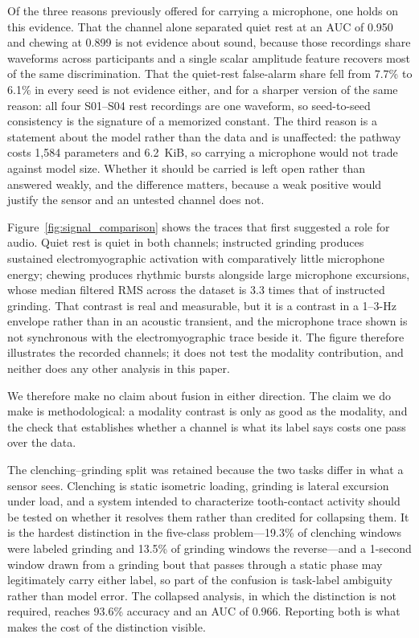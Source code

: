 \documentclass[pdflatex,sn-nature,iicol]{sn-jnl}
\begin{document}
Of the three reasons previously offered for carrying a microphone, one holds on this evidence. That the channel alone separated quiet rest at an AUC of 0.950 and chewing at 0.899 is not evidence about sound, because those recordings share waveforms across participants and a single scalar amplitude feature recovers most of the same discrimination. That the quiet-rest false-alarm share fell from 7.7\% to 6.1\% in every seed is not evidence either, and for a sharper version of the same reason: all four S01--S04 rest recordings are one waveform, so seed-to-seed consistency is the signature of a memorized constant. The third reason is a statement about the model rather than the data and is unaffected: the pathway costs 1,584 parameters and 6.2~KiB, so carrying a microphone would not trade against model size. Whether it should be carried is left open rather than answered weakly, and the difference matters, because a weak positive would justify the sensor and an untested channel does not.

Figure~\ref{fig:signal_comparison} shows the traces that first suggested a role for audio. Quiet rest is quiet in both channels; instructed grinding produces sustained electromyographic activation with comparatively little microphone energy; chewing produces rhythmic bursts alongside large microphone excursions, whose median filtered RMS across the dataset is 3.3 times that of instructed grinding. That contrast is real and measurable, but it is a contrast in a 1--3-Hz envelope rather than in an acoustic transient, and the microphone trace shown is not synchronous with the electromyographic trace beside it. The figure therefore illustrates the recorded channels; it does not test the modality contribution, and neither does any other analysis in this paper.

We therefore make no claim about fusion in either direction. The claim we do make is methodological: a modality contrast is only as good as the modality, and the check that establishes whether a channel is what its label says costs one pass over the data.

The clenching--grinding split was retained because the two tasks differ in what a sensor sees. Clenching is static isometric loading, grinding is lateral excursion under load, and a system intended to characterize tooth-contact activity should be tested on whether it resolves them rather than credited for collapsing them. It is the hardest distinction in the five-class problem---19.3\% of clenching windows were labeled grinding and 13.5\% of grinding windows the reverse---and a 1-second window drawn from a grinding bout that passes through a static phase may legitimately carry either label, so part of the confusion is task-label ambiguity rather than model error. The collapsed analysis, in which the distinction is not required, reaches 93.6\% accuracy and an AUC of 0.966. Reporting both is what makes the cost of the distinction visible.
\end{document}
